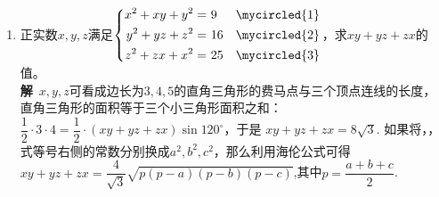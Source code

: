 \begin{enumerate}[label={【\textbf{例\thechapter.\arabic*}】},
 leftmargin=\inteval{\myenumleftmargin}pt,
 itemsep=\inteval{\myenumitempsep}pt,
 itemindent=\inteval{\myenumitemindent}pt]
\begin{gather*}
    x^2+y^2=\dfrac{1}{\cos^2\theta}(x+y)^2-(x^2+y^2) \\
    2(x^2+y^2)-(x+y)^2=\dfrac{1}{\cos^2\theta}(x+y)^2 -(x+y)^2 \\
    (x-y)^2=(\tan\theta)^2(x+y)^2
\end{gather*}
这与(\ref{考虑有理数-情形1})式等价。\\
 方程(\ref{余弦化成t2二次方程})的两根为$ 1,x^2y^2 $，那么
\begin{gather*}
    1+x^2y^2=\dfrac{1}{\cos^2\theta}(x+y)^2-(x^2+y^2) \\
    1+x^2y^2-2xy=\dfrac{1}{\cos^2\theta}(x+y)^2-(x^2+y^2+2xy) \\
    (1-xy)^2=(\tan\theta)^2 (x+y)^2 
\end{gather*}
这与(\ref{考虑有理数-情形2})式等价。\\
 方程(\ref{余弦化成t2二次方程})的两根为$ x,xy^2 $，那么
\begin{gather*}
    x+xy^2=\dfrac{1}{\cos^2\theta}(x+y)^2-(x^2+y^2) \\
    x+xy^2-2xy=\dfrac{1}{\cos^2\theta}(x+y)^2-(x^2+y^2+2xy) 
\end{gather*}
\begin{gather}\label{考虑有理数-情形3已平方}
    x(1-y)^2=(\tan\theta)^2(x+y)^2
\end{gather}
这与(\ref{考虑有理数-情形3})式等价。列举一些整数解的情形：$ \tan\theta=3 $，
(\ref{考虑有理数-情形3已平方})式有$ (1,-2),(4,-14) $等整数解；
$ \tan\theta=4 $，(\ref{考虑有理数-情形3已平方})式有$ (4,-9),(9,-39) $等整数解；
$ \tan\theta=5 $，(\ref{考虑有理数-情形3已平方})式有
$ (9,-24),(16,-84) $等整数解。

\item 正实数$ x,y,z $满足$ \left\{ \begin{aligned} x^2+xy+y^2 =&\ 9  &\mycircled{1} \\
    y^2+yz+z^2=&\ 16 &\mycircled{2} \\
    z^2+zx+x^2=&\ 25 &\mycircled{3} \end{aligned} \right. $，求$ xy+yz+zx $的值。\\
\textbf{解}\ $ x,y,z $可看成边长为$ 3,4,5 $的直角三角形的费马点与三个顶点连线的长度，
直角三角形的面积等于三个小三角形面积之和：$ \dfrac{1}{2}\cdot 3\cdot 4= \dfrac{1}{2}\cdot(xy+yz+zx)\sin 120^{\circ} $，于是
$ xy+yz+zx=8\sqrt{3} $. 如果将，，
式等号右侧的常数分别换成$ a^2,b^2,c^2 $，那么利用海伦公式可得$ xy+yz+zx=
\dfrac{4}{\sqrt{3}}\sqrt{p(p-a)(p-b)(p-c)} $,其中$ p=\dfrac{a+b+c}{2} $. 


\end{enumerate}
